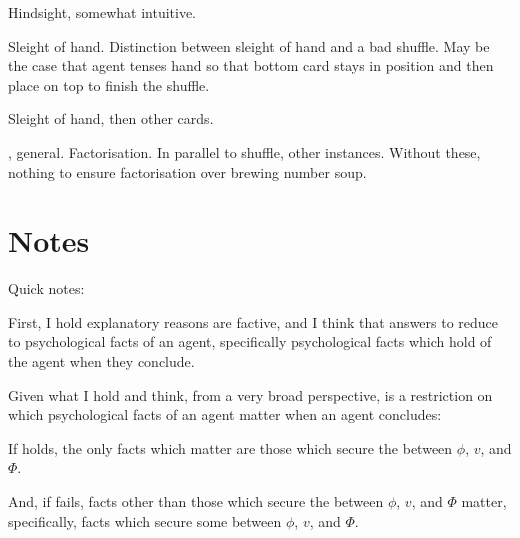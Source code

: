 \begin{note}
  Hindsight, somewhat intuitive.

  Sleight of hand.
  Distinction between sleight of hand and a bad shuffle.
  May be the case that agent tenses hand so that bottom card stays in position and then place on top to finish the shuffle.

  Sleight of hand, then other cards.

  \ros{}, general.
  Factorisation.
  In parallel to shuffle, other instances.
  Without these, nothing to ensure factorisation over brewing number soup.
\end{note}



\section*{Notes}


\begin{note}
  Quick notes:

  First, I hold explanatory reasons are factive, and I think that answers to \qWhy{} reduce to psychological facts of an agent, specifically psychological facts which hold of the agent when they conclude.%


  Given what I hold and think, from a very broad perspective, \issueInclusion{} is a restriction on which psychological facts of an agent matter when an agent concludes:

  If \issueInclusion{} holds, the only facts which matter are those which secure the \ros{} between \(\phi\), \(v\), and \(\Phi\).

  And, if \issueInclusion{} fails, facts other than those which secure the \ros{} between \(\phi\), \(v\), and \(\Phi\) matter, specifically, facts which secure some \ros{} between \(\phi\), \(v\), and \(\Phi\).
\end{note}


